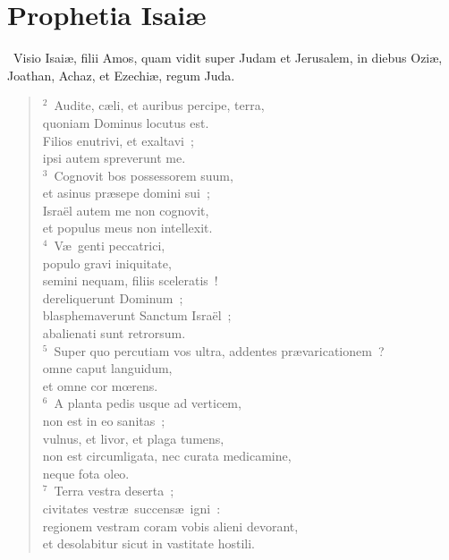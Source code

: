 {\centering \section*{Prophetia Isaiæ}}\thispagestyle{empty}

~Visio Isai\ae , filii Amos, quam vidit super Judam et Jerusalem, in diebus Ozi\ae , Joathan, Achaz, et Ezechi\ae , regum Juda.


\begin{flushleft}\begin{verse}\vspace{6pt}${}^{2}$~Audite, c\ae li, et auribus percipe, terra,\\ quoniam Dominus locutus est.\\ Filios enutrivi, et exaltavi~;\\ ipsi autem spreverunt me.\\
${}^{3}$~Cognovit bos possessorem suum,\\ et asinus pr\ae sepe domini sui~;\\ Isra\"el autem me non cognovit,\\ et populus meus non intellexit.\\
${}^{4}$~V\ae\ genti peccatrici,\\ populo gravi iniquitate,\\ semini nequam, filiis sceleratis~!\\ dereliquerunt Dominum~;\\ blasphemaverunt Sanctum Isra\"el~;\\ abalienati sunt retrorsum.\\
${}^{5}$~Super quo percutiam vos ultra, addentes pr\ae varicationem~?\\ omne caput languidum,\\ et omne cor mœrens.\\
${}^{6}$~A planta pedis usque ad verticem,\\ non est in eo sanitas~;\\ vulnus, et livor, et plaga tumens,\\ non est circumligata, nec curata medicamine,\\ neque fota oleo.\\
${}^{7}$~Terra vestra deserta~;\\ civitates vestr\ae\ succens\ae\ igni~:\\ regionem vestram coram vobis alieni devorant,\\ et desolabitur sicut in vastitate hostili.\\

\end{verse}
\end{flushleft}
